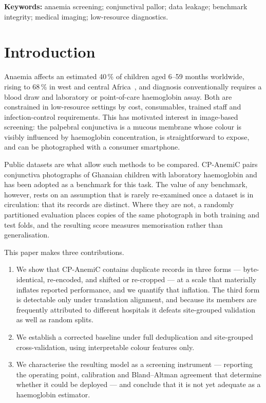 \documentclass[11pt,a4paper]{article}
\begin{document}
\medskip
\noindent\textbf{Keywords:} anaemia screening; conjunctival pallor; data leakage;
benchmark integrity; medical imaging; low-resource diagnostics.

\section{Introduction}

Anaemia affects an estimated 40\,\% of children aged 6--59 months worldwide, rising to
68\,\% in west and central Africa~\cite{stevens2022}, and diagnosis
conventionally requires a blood draw and laboratory or point-of-care haemoglobin assay.
Both are constrained in low-resource settings by cost, consumables, trained staff and
infection-control requirements. This has motivated interest in image-based screening: the
palpebral conjunctiva is a mucous membrane whose colour is visibly influenced by
haemoglobin concentration, is straightforward to expose, and can be photographed with a
consumer smartphone.

Public datasets are what allow such methods to be compared. CP-AnemiC
\cite{asare2023cpanemic} pairs conjunctiva photographs of Ghanaian children with laboratory
haemoglobin and has been adopted as a benchmark for this task. The value of any benchmark,
however, rests on an assumption that is rarely re-examined once a dataset is in circulation:
that its records are distinct. Where they are not, a randomly partitioned evaluation places
copies of the same photograph in both training and test folds, and the resulting score
measures memorisation rather than generalisation.

This paper makes three contributions.

\begin{enumerate}
  \item We show that CP-AnemiC contains duplicate records in three forms --- byte-identical,
        re-encoded, and shifted or re-cropped --- at a scale that materially inflates reported
        performance, and we quantify that inflation. The third form is detectable only under
        translation alignment, and because its members are frequently attributed to different
        hospitals it defeats site-grouped validation as well as random splits.
  \item We establish a corrected baseline under full deduplication and site-grouped
        cross-validation, using interpretable colour features only.
  \item We characterise the resulting model as a screening instrument --- reporting the
        operating point, calibration and Bland--Altman agreement that determine whether it
        could be deployed --- and conclude that it is not yet adequate as a haemoglobin
        estimator.
\end{enumerate}
\end{document}
